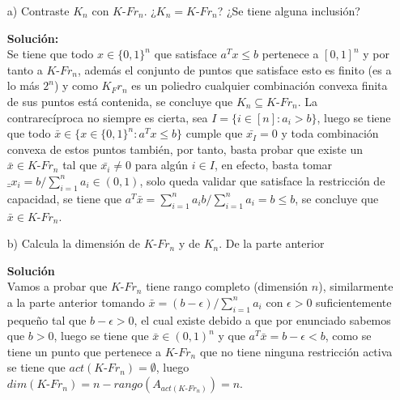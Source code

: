 \documentclass[10pt]{article}
\theoremstyle{plain}
\theoremstyle{definition}
\begin{document}
\begin{itemize}
\item[a)] Contraste $K_{n}$ con $K\text{-}Fr_{n}$. ¿$K_{n}=K\text{-}Fr_{n}$? ¿Se tiene alguna inclusión?

\textbf{Solución:}\\

Se tiene que todo $x\in\{0,1\}^{n}$ que satisface $a^{T}x\leq b$ pertenece a $[0,1]^{n}$ y por tanto a $K\text{-}Fr_{n}$, además el conjunto de puntos que satisface esto es finito (es a lo más $2^{n}$) y como $K_Fr_{n}$ es un poliedro cualquier combinación convexa finita de sus puntos está contenida, se concluye que $K_{n}\subseteq K\text{-}Fr_{n}$. La contrarecíproca no siempre es cierta, sea $I=\{i\in[n]: a_{i}>b\}$, luego se tiene que todo $\bar{x}\in \{x\in\{0,1\}^{n}:a^{T}x\leq b\}$ cumple que $\bar{x_{I}}=0$ y toda combinación convexa de estos puntos también, por tanto, basta probar que existe un $\bar{x} \in K\text{-}Fr_{n}$ tal que $\bar{x_{i}}\neq0$ para algún $i\in I$, en efecto, basta tomar $\bar_{x_{i}}= b/\sum_{i=1}^{n}a_{i} \in (0,1)$, solo queda validar que satisface la restricción de capacidad, se tiene que $a^{T}\bar{x}=\sum_{i=1}^{n}a_{i}b/\sum_{i=1}^{n}a_{i}=b\leq b$, se concluye que $\bar{x} \in K\text{-}Fr_{n}$.

\item[b)] Calcula la dimensión de $K\text{-}Fr_{n}$ y de $K_{n}$.
De la parte anterior

\textbf{Solución}\\

Vamos a probar que $K\text{-}Fr_{n}$ tiene rango completo (dimensión $n$), similarmente a la parte anterior tomando $\bar{x}=(b-\epsilon)/\sum_{i=1}^{n}a_{i}$ con $\epsilon>0$ suficientemente pequeño tal que $b-\epsilon>0$, el cual existe debido a que por enunciado sabemos que $b>0$, luego se tiene que $\bar{x}\in(0,1)^{n}$ y que $a^{T}\bar{x} = b-\epsilon <b$, como se tiene un punto que pertenece a $K\text{-}Fr_{n}$ que no tiene ninguna restricción activa se tiene que $act(K\text{-}Fr_{n})=\emptyset$, luego $dim(K\text{-}Fr_{n})=n-rango(A_{act(K\text{-}Fr_{n})})=n$.\\


\end{itemize}
\end{document}
